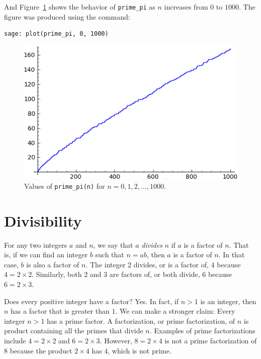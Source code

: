 %
And Figure~\ref{fig:number_theory:prime_pi_for_n_leq_1000} shows the
behavior of \verb!prime_pi! as $n$ increases from $0$ to $1000$. The
figure was produced using the command:
%
\begin{lstlisting}
sage: plot(prime_pi, 0, 1000)
\end{lstlisting}
%
\begin{figure}[!htbp]
\centering
\includegraphics[scale=0.8]{images/prime-pi-1000}
\caption{Values of \texttt{prime\_pi(n)} for $n = 0, 1, 2, \dots, 1000$.}
\label{fig:number_theory:prime_pi_for_n_leq_1000}
\end{figure}



\section{Divisibility}

For any two integers $a$ and $n$, we say that $a$
\emph{divides} $n$ if $a$ is a factor of $n$. That is,
if we can find an integer $b$ such that $n = ab$, then $a$ is a
factor of $n$. In that case, $b$ is also a factor of
$n$. The integer $2$ divides, or is a factor of, $4$ because
$4 = 2 \times 2$. Similarly, both $2$ and $3$ are factors of, or both
divide, $6$ because $6 = 2 \times 3$.

Does every positive integer have a factor? Yes. In fact,
if $n > 1$ is an integer, then $n$ has a factor that is greater than
$1$. We can make a stronger claim: Every integer $n > 1$ has a prime
factor. A factorization, or prime factorization, of $n$ is product
containing all the primes that divide $n$. Examples of prime
factorizations include $4 = 2 \times 2$ and $6 = 2 \times 3$. However,
$8 = 2 \times 4$ is not a prime factorization of $8$ because the
product $2 \times 4$ has $4$, which is not prime.

